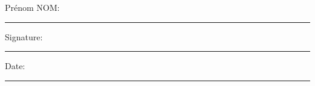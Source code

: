\documentclass[11pt,oneside,french]{book}
\begin{document}
\noindent Prénom NOM:\\[1mm]
\rule[1em]{25em}{0.5pt}

\noindent Signature:\\[1mm]
\rule[1em]{25em}{0.5pt}

\noindent Date:\\[1mm]
\rule[1em]{25em}{0.5pt}







\tableofcontents
\listoffigures
\listoftables



\mainmatter










 
 



\begin{appendices}


\end{appendices}
\end{document}
